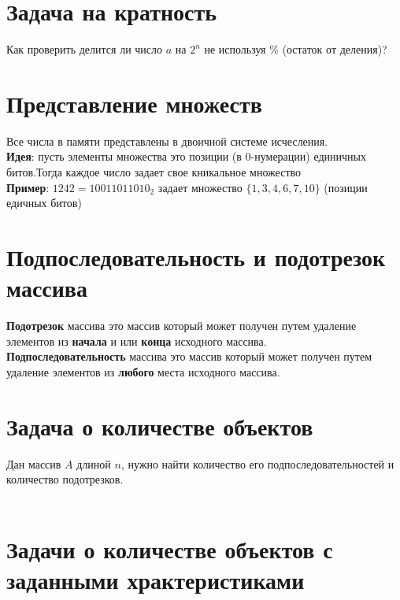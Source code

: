 \documentclass[10pt]{article}
\begin{document}
    \section{Задача на кратность}
    Как проверить делится ли число $a$ на $2^n$ не используя $\%$ (остаток от деления)?
    \\ 
    \section{Представление множеств}
    Все числа в памяти представлены в двоичной системе исчесления.
    \\
    \textbf{Идея}: пусть элементы множества это позиции (в 0-нумерации) единичных битов.Тогда каждое число задает свое кникальное множество
    \\
    \textbf{Пример}: $1242 = 10011011010_2$ задает множество $\{1 , 3 , 4 , 6 , 7 , 10\}$ (позиции едичных битов)
    \section{Подпоследовательность и подотрезок массива}
       \textbf{Подотрезок} массива это массив который может получен путем удаление элементов из \textbf{начала} и или \textbf{конца} исходного массива.
       \vspace{5mm}
       \\
    \textbf{Подпоследовательность} массива это массив который может получен путем удаление элементов из \textbf{любого} места исходного массива.
    
    \section{Задача о количестве объектов}
    
    Дан массив $A$ длиной $n$, нужно найти количество его  подпоследовательностей и количество подотрезков.
    \\
    \\
    
    
    \section{Задачи о количестве объектов с заданными храктеристиками}
    
\end{document}
